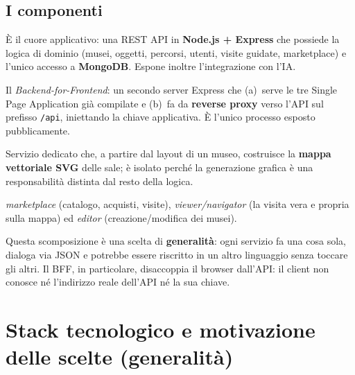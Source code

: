 \documentclass[11pt,a4paper]{article}
\newcommand{\code}[1]{\texttt{#1}}
\begin{document}
\subsection{I componenti}
\begin{description}[leftmargin=1.4em,style=nextline]
  \item[openAPI (\code{server/openAPI})] È il cuore applicativo: una REST API in
    \textbf{Node.js + Express} che possiede la logica di dominio (musei, oggetti,
    percorsi, utenti, visite guidate, marketplace) e l'unico accesso a
    \textbf{MongoDB}. Espone inoltre l'integrazione con l'IA.
  \item[BFF (\code{navigator/UI/bff})] Il \emph{Backend-for-Frontend}: un secondo
    server Express che (a)~serve le tre Single Page Application già compilate e
    (b)~fa da \textbf{reverse proxy} verso l'API sul prefisso \code{/api},
    iniettando la chiave applicativa. È l'unico processo esposto pubblicamente.
  \item[SVG server (\code{map-creator/js\_server})] Servizio dedicato che, a
    partire dal layout di un museo, costruisce la \textbf{mappa vettoriale SVG}
    delle sale; è isolato perché la generazione grafica è una responsabilità
    distinta dal resto della logica.
  \item[Le tre SPA] \emph{marketplace} (catalogo, acquisti, visite),
    \emph{viewer/navigator} (la visita vera e propria sulla mappa) ed
    \emph{editor} (creazione/modifica dei musei).
\end{description}

Questa scomposizione è una scelta di \textbf{generalità}: ogni servizio fa una
cosa sola, dialoga via JSON e potrebbe essere riscritto in un altro linguaggio
senza toccare gli altri. Il BFF, in particolare, disaccoppia il browser
dall'API: il client non conosce né l'indirizzo reale dell'API né la sua chiave.

\section{Stack tecnologico e motivazione delle scelte (generalità)}
\end{document}
